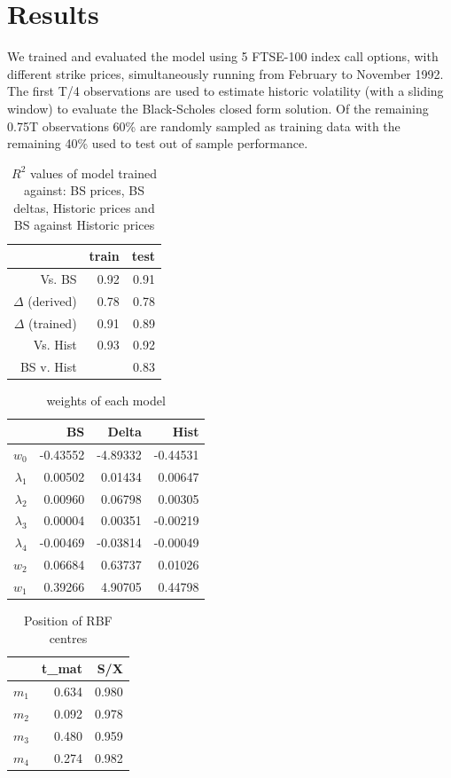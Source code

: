 \documentclass{sig-alternate-05-2015}
\begin{document}
\section{Results}

We trained and evaluated the model using 5 FTSE-100 index call options, with different strike prices, simultaneously running from February to November 1992. The first T/4 observations are used to estimate historic volatility (with a sliding window) to evaluate the Black-Scholes closed form solution. Of the remaining 0.75T observations 60\% are randomly sampled as training data with the remaining 40\% used to test out of sample performance.   

\begin{table}[ht]
\centering
\begin{tabular}{rrr}
  \hline
 & train & test \\ 
  \hline
Vs. BS & 0.92 & 0.91 \\ 
  $\Delta$ (derived) & 0.78 & 0.78 \\ 
  $\Delta$ (trained) & 0.91 & 0.89 \\ 
  Vs. Hist & 0.93 & 0.92 \\ 
  BS v. Hist &  & 0.83 \\ 
   \hline
\end{tabular}
\caption{$R^2$ values of model trained against: BS prices, BS deltas, Historic prices and BS against Historic prices}
\end{table}


\begin{table}[ht]
\centering
\begin{tabular}{rrrr}
  \hline
 & BS & Delta & Hist \\ 
  \hline
$w_0$ & -0.43552 & -4.89332 & -0.44531 \\ 
  $\lambda_1$ & 0.00502 & 0.01434 & 0.00647 \\ 
  $\lambda_2$ & 0.00960 & 0.06798 & 0.00305 \\ 
  $\lambda_3$ & 0.00004 & 0.00351 & -0.00219 \\ 
  $\lambda_4$ & -0.00469 & -0.03814 & -0.00049 \\ 
  $w_2$ & 0.06684 & 0.63737 & 0.01026 \\ 
  $w_1$ & 0.39266 & 4.90705 & 0.44798 \\ 
   \hline
\end{tabular}
\caption{weights of each model}
\end{table}

\begin{table}[ht]
\centering
\begin{tabular}{rrr}
  \hline
 & t\_mat & S/X \\ 
  \hline
  $m_1$ & 0.634 & 0.980 \\ 
  $m_2$ & 0.092 & 0.978 \\ 
  $m_3$ & 0.480 & 0.959 \\ 
  $m_4$ & 0.274 & 0.982 \\ 
   \hline
\end{tabular}
\caption{Position of RBF centres}
\end{table}
\end{document}
